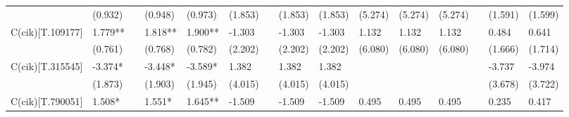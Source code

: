 \begin{table}
\begin{center}
\begin{tabular}{lllllllllllllll}
                  & (0.932)            &                    & (0.948)                & (0.973)             & (1.853)              &                      & (1.853)                  & (1.853)               & (5.274)              & (5.274)                  & (5.274)               &                               & (1.591)                                   & (1.599)                                 \\
C(cik)[T.109177]  & 1.779**            &                    & 1.818**                & 1.900**             & -1.303               &                      & -1.303                   & -1.303                & 1.132                & 1.132                    & 1.132                 &                               & 0.484                                     & 0.641                                   \\
                  & (0.761)            &                    & (0.768)                & (0.782)             & (2.202)              &                      & (2.202)                  & (2.202)               & (6.080)              & (6.080)                  & (6.080)               &                               & (1.666)                                   & (1.714)                                 \\
C(cik)[T.315545]  & -3.374*            &                    & -3.448*                & -3.589*             & 1.382                &                      & 1.382                    & 1.382                 &                      &                          &                       &                               & -3.737                                    & -3.974                                  \\
                  & (1.873)            &                    & (1.903)                & (1.945)             & (4.015)              &                      & (4.015)                  & (4.015)               &                      &                          &                       &                               & (3.678)                                   & (3.722)                                 \\
C(cik)[T.790051]  & 1.508*             &                    & 1.551*                 & 1.645**             & -1.509               &                      & -1.509                   & -1.509                & 0.495                & 0.495                    & 0.495                 &                               & 0.235                                     & 0.417                                   \\

\end{tabular}
\end{center}
\end{table}
